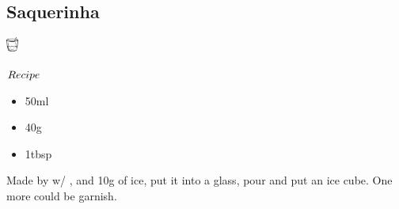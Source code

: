 \subsection{Saquerinha}
\vspace{-7mm}
\hspace{37mm}
\includegraphics[width=4mm]{cocktail_glass_rock.png}
\vspace{2.5mm}
\begin{itembox}[l]{\boldmath $Recipe$}
\begin{itemize}
\setlength{\parskip}{0cm}
\setlength{\itemsep}{0cm}
\item \sake 50ml
\item \strawberry 40g
\item \sugar 1tbsp
\end{itemize}
\vspace{-4mm}
Made by \blend w/ \strawberry
\hspace{-1mm}, \sugar and 10g of ice, put it into a glass, pour \sake and put an ice cube. One more \strawberry could be garnish.
\end{itembox}
